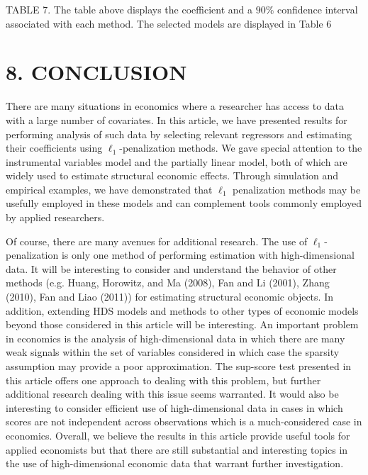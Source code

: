 \documentclass[10pt]{article}
\begin{document}
TABLE 7. The table above displays the coefficient and a \(90 \%\) confidence interval associated with each method. The selected models are displayed in Table 6

\section*{8. CONCLUSION}
There are many situations in economics where a researcher has access to data with a large number of covariates. In this article, we have presented results for performing analysis of such data by selecting relevant regressors and estimating their coefficients using \(\ell_{1}\)-penalization methods. We gave special attention to the instrumental variables model and the partially linear model, both of which are widely used to estimate structural economic effects. Through simulation and empirical examples, we have demonstrated that \(\ell_{1}\) penalization methods may be usefully employed in these models and can complement tools commonly employed by applied researchers.

Of course, there are many avenues for additional research. The use of \(\ell_{1}\)-penalization is only one method of performing estimation with high-dimensional data. It will be interesting to consider and understand the behavior of other methods (e.g. Huang, Horowitz, and Ma (2008), Fan and Li (2001), Zhang (2010), Fan and Liao (2011)) for estimating structural economic objects. In addition, extending HDS models and methods to other types of economic models beyond those considered in this article will be interesting. An important problem in economics is the analysis of high-dimensional data in which there are many weak signals within the set of variables considered in which case the sparsity assumption may provide a poor approximation. The sup-score test presented in this article offers one approach to dealing with this problem, but further additional research dealing with this issue seems warranted. It would also be interesting to consider efficient use of high-dimensional data in cases in which scores are not independent across observations which is a much-considered case in economics. Overall, we believe the results in this article provide useful tools for applied economists but that there are still substantial and interesting topics in the use of high-dimensional economic data that warrant further investigation.
\end{document}
